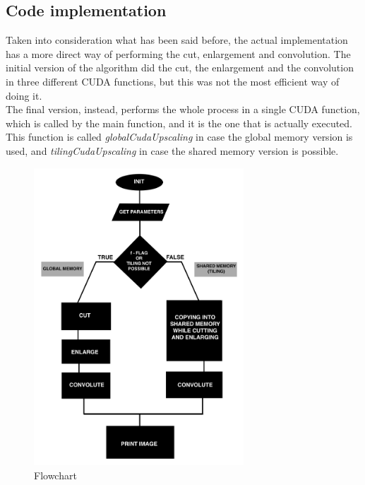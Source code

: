     \subsection{Code implementation}
    Taken into consideration what has been said before, the actual implementation has a more direct way of performing the cut, enlargement and convolution.
    The initial version of the algorithm did the cut, the enlargement and the convolution in three different CUDA functions, but this was not the most efficient way of doing it.\\
    The final version, instead, performs the whole process in a single CUDA function, which is called by the main function, and it is the one that is actually executed.
    This function is called \textit{globalCudaUpscaling} in case the global memory version is used, and \textit{tilingCudaUpscaling} in case the shared memory version is possible.

    \begin{figure}[h]
        \centering
        \includegraphics[width=0.7\textwidth]{img/flowchart.png}
        \caption{Flowchart}
        \label{fig:flowchart}
    \end{figure}